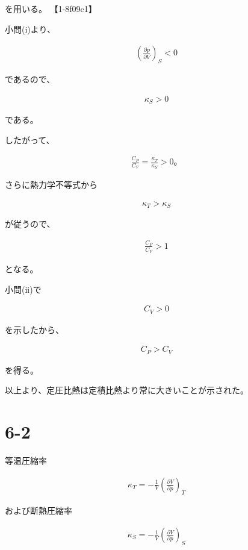\documentclass[platex,dvipdfmx,a4paper]{jsarticle}
\begin{document}
を用いる。 【1-8f09c1】

小問(i)より、

\begin{align*}
\left(
\frac{\partial p}{\partial V}
\right)_S
<0
\end{align*}

であるので、

\begin{align*}
\kappa_S>0
\end{align*}

である。

したがって、

\begin{align*}
\frac{C_P}{C_V}
=
\frac{\kappa_T}{\kappa_S}
>0。
\end{align*}

さらに熱力学不等式から

\begin{align*}
\kappa_T>\kappa_S
\end{align*}

が従うので、

\begin{align*}
\frac{C_P}{C_V}
>1
\end{align*}

となる。

小問(ii)で

\begin{align*}
C_V>0
\end{align*}

を示したから、

\begin{align*}
C_P>C_V
\end{align*}

を得る。

以上より、定圧比熱は定積比熱より常に大きいことが示された。
\section{6-2}

等温圧縮率

\begin{align*}
\kappa_T
=
-\frac{1}{V}
\left(
\frac{\partial V}{\partial p}
\right)_T
\end{align*}

および断熱圧縮率

\begin{align*}
\kappa_S
=
-\frac{1}{V}
\left(
\frac{\partial V}{\partial p}
\right)_S
\end{align*}
\end{document}
